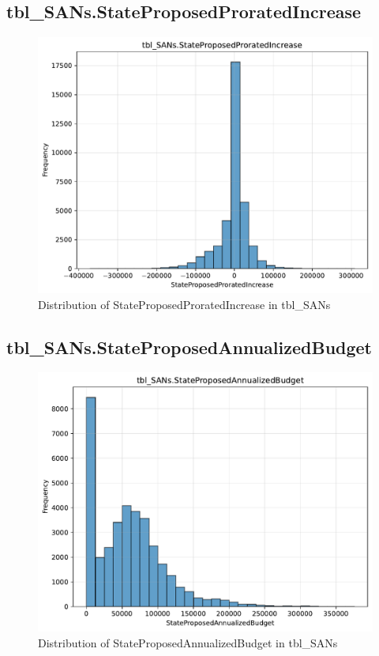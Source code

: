 \subsection{tbl\_SANs.StateProposedProratedIncrease}

\begin{figure}[htbp]
\centering
\includegraphics[width=\textwidth]{figures/dbo_tbl_SANs_StateProposedProratedIncrease.pdf}
\caption{Distribution of StateProposedProratedIncrease in tbl\_SANs}
\end{figure}\newpage

\subsection{tbl\_SANs.StateProposedAnnualizedBudget}

\begin{figure}[htbp]
\centering
\includegraphics[width=\textwidth]{figures/dbo_tbl_SANs_StateProposedAnnualizedBudget.pdf}
\caption{Distribution of StateProposedAnnualizedBudget in tbl\_SANs}
\end{figure}\newpage

